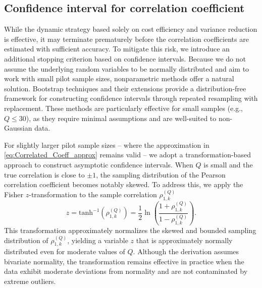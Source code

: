 \subsection{Confidence interval for correlation coefficient}
While the dynamic strategy based solely on cost efficiency and variance reduction is effective, it may terminate prematurely before the correlation coefficients are estimated with sufficient accuracy. To mitigate this risk, we introduce an additional stopping criterion based on confidence intervals. Because we do not assume the underlying random variables to be normally distributed and aim to work with small pilot sample sizes, nonparametric methods offer a natural solution. Bootstrap techniques \cite{Ef:1979, EfTi:1993} and their extensions \cite{BeDeToMeBaRo:2007} provide a distribution-free framework for constructing confidence intervals through repeated resampling with replacement. These methods are particularly effective for small samples (e.g., $Q \leq 30$), as they require minimal assumptions and are well-suited to non-Gaussian data.

For slightly larger pilot sample sizes -- where the approximation in \eqref{eq:Correlated_Coeff_approx} remains valid -- we adopt a transformation-based approach to construct asymptotic confidence intervals. When $Q$ is small and the true correlation is close to $\pm 1$, the sampling distribution of the Pearson correlation coefficient becomes notably skewed. To address this, we apply the Fisher $z$-transformation \cite{Fi:1915, Fi:1921} to the sample correlation $\rho_{1,k}^{(Q)}$
%
\begin{equation}
\label{eq:z_prime}
    z  = \text{tanh}^{-1}\left(\rho_{1,k}^{(Q)}\right) = \frac 1 2\ln \left(\frac{1+\rho_{1,k}^{(Q)}}{1-\rho_{1,k}^{(Q)}}\right).
\end{equation}
%
This transformation approximately normalizes the skewed and bounded sampling distribution of $\rho_{1,k}^{(Q)}$, yielding a variable $z$ that is approximately normally distributed even for moderate values of $Q$. Although the derivation assumes bivariate normality, the transformation remains effective in practice when the data exhibit moderate deviations from normality and are not contaminated by extreme outliers. 

